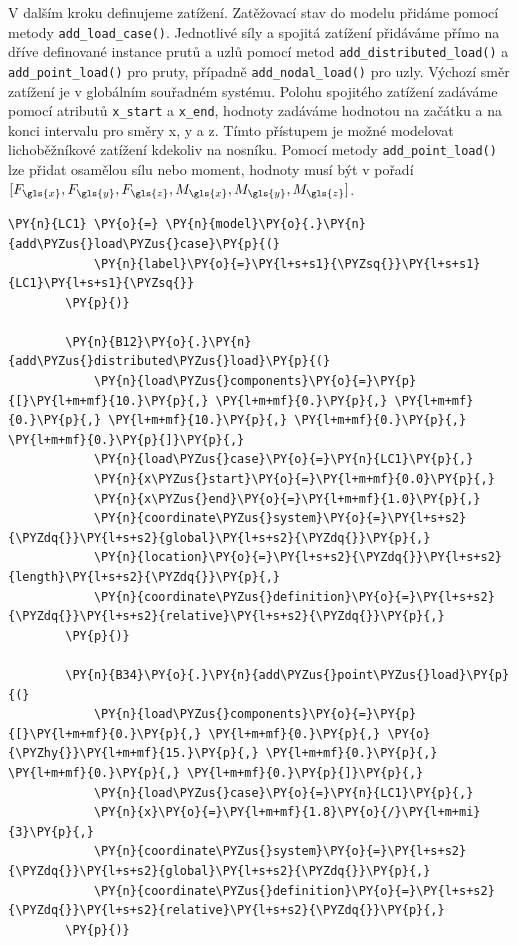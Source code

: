 V dalším kroku definujeme zatížení. Zatěžovací stav do modelu přidáme pomocí metody \texttt{add\_load\_case()}. Jednotlivé síly a spojitá zatížení přidáváme přímo na dříve definované instance prutů a uzlů pomocí metod \texttt{add\_distributed\_load()} a \texttt{add\_point\_load()} pro pruty, případně \texttt{add\_nodal\_load()} pro uzly. Výchozí směr zatížení je v globálním souřadném systému. Polohu spojitého zatížení zadáváme pomocí atributů \texttt{x\_start} a \texttt{x\_end}, hodnoty zadáváme hodnotou na začátku a na konci intervalu pro směry \gls{x}, \gls{y} a \gls{z}. Tímto přístupem je možné modelovat lichoběžníkové zatížení kdekoliv na nosníku. Pomocí metody \texttt{add\_point\_load()} lze přidat osamělou sílu nebo moment, hodnoty musí být v pořadí $[F_{\gls{x}}, F_{\gls{y}}, F_{\gls{z}}, M_{\gls{x}}, M_{\gls{y}}, M_{\gls{z}}]$.
\begin{tcolorbox}[breakable, size=fbox, boxrule=1pt, pad at break*=1mm,colback=cellbackground, colframe=cellborder]
    \begin{Verbatim}[commandchars=\\\{\}]
        \PY{n}{LC1} \PY{o}{=} \PY{n}{model}\PY{o}{.}\PY{n}{add\PYZus{}load\PYZus{}case}\PY{p}{(}
            \PY{n}{label}\PY{o}{=}\PY{l+s+s1}{\PYZsq{}}\PY{l+s+s1}{LC1}\PY{l+s+s1}{\PYZsq{}}
        \PY{p}{)}
        
        \PY{n}{B12}\PY{o}{.}\PY{n}{add\PYZus{}distributed\PYZus{}load}\PY{p}{(}
            \PY{n}{load\PYZus{}components}\PY{o}{=}\PY{p}{[}\PY{l+m+mf}{10.}\PY{p}{,} \PY{l+m+mf}{0.}\PY{p}{,} \PY{l+m+mf}{0.}\PY{p}{,} \PY{l+m+mf}{10.}\PY{p}{,} \PY{l+m+mf}{0.}\PY{p}{,} \PY{l+m+mf}{0.}\PY{p}{]}\PY{p}{,}
            \PY{n}{load\PYZus{}case}\PY{o}{=}\PY{n}{LC1}\PY{p}{,}
            \PY{n}{x\PYZus{}start}\PY{o}{=}\PY{l+m+mf}{0.0}\PY{p}{,}
            \PY{n}{x\PYZus{}end}\PY{o}{=}\PY{l+m+mf}{1.0}\PY{p}{,}
            \PY{n}{coordinate\PYZus{}system}\PY{o}{=}\PY{l+s+s2}{\PYZdq{}}\PY{l+s+s2}{global}\PY{l+s+s2}{\PYZdq{}}\PY{p}{,}
            \PY{n}{location}\PY{o}{=}\PY{l+s+s2}{\PYZdq{}}\PY{l+s+s2}{length}\PY{l+s+s2}{\PYZdq{}}\PY{p}{,}
            \PY{n}{coordinate\PYZus{}definition}\PY{o}{=}\PY{l+s+s2}{\PYZdq{}}\PY{l+s+s2}{relative}\PY{l+s+s2}{\PYZdq{}}\PY{p}{,}
        \PY{p}{)}
        
        \PY{n}{B34}\PY{o}{.}\PY{n}{add\PYZus{}point\PYZus{}load}\PY{p}{(}
            \PY{n}{load\PYZus{}components}\PY{o}{=}\PY{p}{[}\PY{l+m+mf}{0.}\PY{p}{,} \PY{l+m+mf}{0.}\PY{p}{,} \PY{o}{\PYZhy{}}\PY{l+m+mf}{15.}\PY{p}{,} \PY{l+m+mf}{0.}\PY{p}{,} \PY{l+m+mf}{0.}\PY{p}{,} \PY{l+m+mf}{0.}\PY{p}{]}\PY{p}{,}
            \PY{n}{load\PYZus{}case}\PY{o}{=}\PY{n}{LC1}\PY{p}{,}
            \PY{n}{x}\PY{o}{=}\PY{l+m+mf}{1.8}\PY{o}{/}\PY{l+m+mi}{3}\PY{p}{,}
            \PY{n}{coordinate\PYZus{}system}\PY{o}{=}\PY{l+s+s2}{\PYZdq{}}\PY{l+s+s2}{global}\PY{l+s+s2}{\PYZdq{}}\PY{p}{,}
            \PY{n}{coordinate\PYZus{}definition}\PY{o}{=}\PY{l+s+s2}{\PYZdq{}}\PY{l+s+s2}{relative}\PY{l+s+s2}{\PYZdq{}}\PY{p}{,}
        \PY{p}{)}
        

\end{Verbatim}
\end{tcolorbox}
